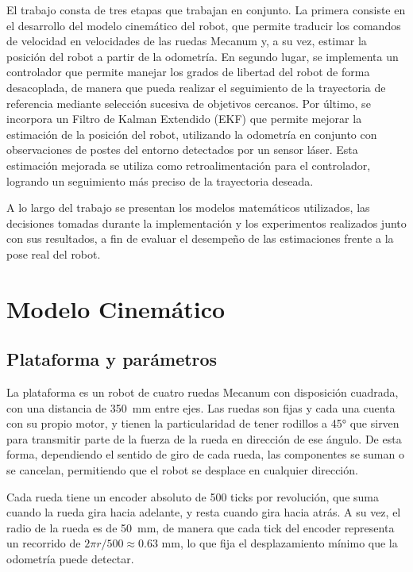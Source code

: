\documentclass[11pt,a4paper]{article}
\begin{document}
El trabajo consta de tres etapas que trabajan en conjunto. La primera consiste en el desarrollo del modelo cinemático del robot, que permite traducir los comandos de velocidad en velocidades de las ruedas Mecanum y, a su vez, estimar la posición del robot a partir de la odometría. En segundo lugar, se implementa un controlador que permite manejar los grados de libertad del robot de forma desacoplada, de manera que pueda realizar el seguimiento de la trayectoria de referencia mediante selección sucesiva de objetivos cercanos. Por último, se incorpora un Filtro de Kalman Extendido (EKF) que permite mejorar la estimación de la posición del robot, utilizando la odometría en conjunto con observaciones de postes del entorno detectados por un sensor láser. Esta estimación mejorada se utiliza como retroalimentación para el controlador, logrando un seguimiento más preciso de la trayectoria deseada.

A lo largo del trabajo se presentan los modelos matemáticos utilizados, las decisiones tomadas durante la implementación y los experimentos realizados junto con sus resultados, a fin de evaluar el desempeño de las estimaciones frente a la pose real del robot.

\section{Modelo Cinemático}
\label{sec:modelo}
\subsection{Plataforma y parámetros}

La plataforma es un robot de cuatro ruedas Mecanum con disposición cuadrada, con una distancia de 350~mm entre ejes. Las ruedas son fijas y cada una cuenta con su propio motor, y tienen la particularidad de tener rodillos a 45° que sirven para transmitir parte de la fuerza de la rueda en dirección de ese ángulo. De esta forma, dependiendo el sentido de giro de cada rueda, las componentes se suman o se cancelan, permitiendo que el robot se desplace en cualquier dirección. 

Cada rueda tiene un encoder absoluto de 500 ticks por revolución, que suma cuando la rueda gira hacia adelante, y resta cuando gira hacia atrás. A su vez, el radio de la rueda es de 50~mm, de manera que cada tick del encoder representa un recorrido de $2\pi r/500 \approx 0.63$ mm, lo que fija el desplazamiento mínimo que la odometría puede detectar. 
\end{document}
